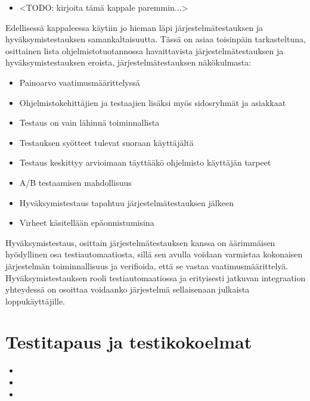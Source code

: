    \begin{itemize}
      \item <TODO: kirjoita tämä kappale paremmin...>
    \end{itemize}

    Edellisessä kappaleessa käytiin jo hieman läpi järjestelmätestauksen ja hyväksymistestauksen samankaltaisuutta.
    Tässä on asiaa toisinpäin tarkasteltuna, osittainen lista ohjelmistotuotannossa havaittavista järjestelmätestauksen ja hyväksymistestauksen eroista, järjestelmätestauksen näkökulmasta:

    \begin{itemize}
      \item Painoarvo vaatimusmäärittelyssä
      \item Ohjelmistokehittäjien ja testaajien lisäksi myös sidosryhmät ja asiakkaat
      \item Testaus on vain lähinnä toiminnallista
      \item Testauksen syötteet tulevat suoraan käyttäjältä
      \item Testaus keskittyy arvioimaan täyttääkö ohjelmisto käyttäjän tarpeet
      \item A/B testaamisen mahdollisuus
      \item Hyväksymistestaus tapahtuu järjestelmätestauksen jälkeen
      \item Virheet käsitellään epäonnistumisina
    \end{itemize}

    Hyväksymistestaus, osittain järjestelmätestauksen kanssa on äärimmäisen hyödyllinen osa testiautomaatiosta, sillä sen avulla voidaan varmistaa kokonaisen järjestelmän toiminnallisuus ja verifioida, että se vastaa vaatimusmäärittelyä.
    Hyväksymistestauksen rooli testiautomaatiossa ja erityisesti jatkuvan integraation yhteydessä on osoittaa voidaanko järjestelmä sellaisenaan julkaista loppukäyttäjille.

\section{Testitapaus ja testikokoelmat} \label{ch:07_testitapaus_ja_testikokoelmat}

  \begin{itemize}
    \item <TODO: Lisää testitapauksen esittely tähän>
    \item <TODO: Lisää testikokoelman esittely tähän>
    \item <TODO: Korosta testikokoelman ja käyttöliittymän näkymän yhteyttä tässä>
  \end{itemize}


